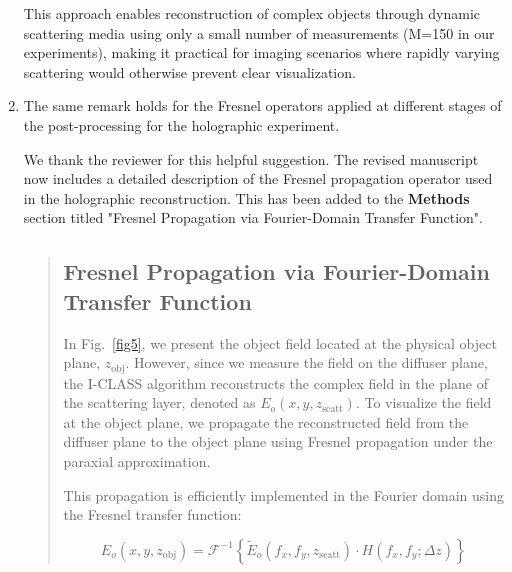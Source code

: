 \documentclass[12pt]{article}
\newcommand{\hlred}[1]{\sethlcolor{red!30}\hl{#1}}
\newenvironment{solved_reviewercomment}
    {\begin{tcolorbox}[width=\linewidth,colback=gray!5,colframe=solved_commentcolor!50,title=Reviewer Comment,left=5pt,right=5pt]}
    {\end{tcolorbox}}
\newenvironment{ourresponse}
    {\begin{tcolorbox}[width=\linewidth,breakable,enhanced,colback=gray!5,colframe=responsecolor!50,title=Response,left=5pt,right=5pt]}
    {\end{tcolorbox}}
\begin{document}
\begin{enumerate}[label=\arabic*.]
\begin{ourresponse}
        This approach enables reconstruction of complex objects through dynamic scattering media using only a small number of measurements (M=150 in our experiments), making it practical for imaging scenarios where rapidly varying scattering would otherwise prevent clear visualization.
    \end{ourresponse}
    
    
    \item \leavevmode\vspace{-\baselineskip}
    \begin{solved_reviewercomment}
        The same remark holds for the Fresnel operators applied at different stages of the post-processing for the holographic experiment.
    \end{solved_reviewercomment}

    

    \begin{ourresponse}
        We thank the reviewer for this helpful suggestion. The revised manuscript now includes a detailed description of the Fresnel propagation operator used in the holographic reconstruction. This has been added to the \textbf{Methods} section titled "Fresnel Propagation via Fourier-Domain Transfer Function".
        \begin{quote}
            \subsection*{Fresnel Propagation via Fourier-Domain Transfer Function}
            \label{Fresnel_propagation}
            In Fig.~\ref{fig5}, we present the object field located at the physical object plane, $z_{\text{obj}}$. However, since we measure the field on the diffuser plane, the I-CLASS algorithm reconstructs the complex field in the plane of the scattering layer, denoted as $E_o(x, y, z_{\text{scatt}})$. To visualize the field at the object plane, we propagate the reconstructed field from the diffuser plane to the object plane using Fresnel propagation under the paraxial approximation.
            
            This propagation is efficiently implemented in the Fourier domain using the Fresnel transfer function:
            
            \begin{equation}
                E_o(x, y, z_{\text{obj}}) = \mathcal{F}^{-1} \left\{ \tilde{E}_o(f_x, f_y, z_{\text{scatt}}) \cdot H(f_x, f_y; \Delta z) \right\}
            \end{equation}
            

\end{quote}
\end{ourresponse}
\end{enumerate}
\end{document}
